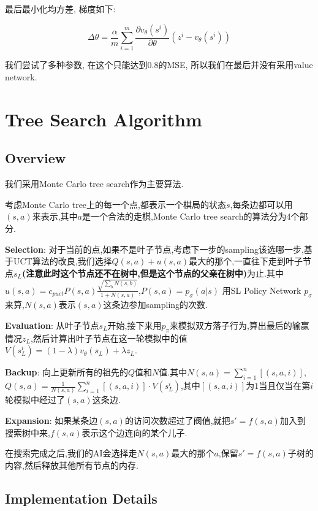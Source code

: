 \documentclass[twocolumn]{article}
\begin{document}
最后最小化均方差, 梯度如下:

\[
\Delta\theta = \frac{\alpha}{m} \sum_{i=1}^m\frac{\partial v_\theta(s^i)}{\partial \theta}(z^i - v_\theta(s^i))
\]

我们尝试了多种参数, 在这个只能达到0.8的MSE, 所以我们在最后并没有采用value network.

\section{Tree Search Algorithm}

\subsection{Overview}

我们采用Monte Carlo tree search作为主要算法.

考虑Monte Carlo tree上的每一个点,都表示一个棋局的状态$s$,每条边都可以用$(s, a)$来表示,其中$a$是一个合法的走棋,Monte Carlo tree search的算法分为4个部分.

\noindent\textbf{Selection}: 对于当前的点,如果不是叶子节点,考虑下一步的sampling该选哪一步,基于UCT算法的改良,我们选择$Q(s, a) + u(s, a)$最大的那个,一直往下走到叶子节点$s_L$\textbf{(注意此时这个节点还不在树中,但是这个节点的父亲在树中)}为止.其中$u(s, a) = c_{puct}P(s, a)\frac{\sqrt{\sum_{b}N(s,b)}}{1+N(s,a)}$,$P(s, a)=p_\sigma(a|s)$ 用SL Policy Network $p_\sigma$来算,$N(s,a)$表示$(s,a)$这条边参加sampling的次数.

\noindent\textbf{Evaluation}: 从叶子节点$s_L$开始,接下来用$p_\pi$来模拟双方落子行为,算出最后的输赢情况$z_L$,然后计算出叶子节点在这一轮模拟中的值$V(s_L^i)=(1-\lambda)v_\theta(s_L) + \lambda z_L$.

\noindent\textbf{Backup}: 向上更新所有的祖先的$Q$值和$N$值.其中$N(s, a) = \sum_{i=1}^n[(s,a,i)]$,$Q(s, a) = \frac{1}{N(s,a)}\sum_{i=1}^n{[(s,a,i)] \cdot V(s_L^i)}$,其中$[(s,a,i)]$为$1$当且仅当在第$i$轮模拟中经过了$(s, a)$这条边.

\noindent\textbf{Expansion}: 如果某条边$(s, a)$的访问次数超过了阀值,就把$s'= f(s,a)$加入到搜索树中来,$f(s,a)$表示这个边连向的某个儿子.

在搜索完成之后,我们的AI会选择走$N(s, a)$最大的那个$a$,保留$s'=f(s, a)$子树的内容,然后释放其他所有节点的内存.

\subsection{Implementation Details}
\end{document}
